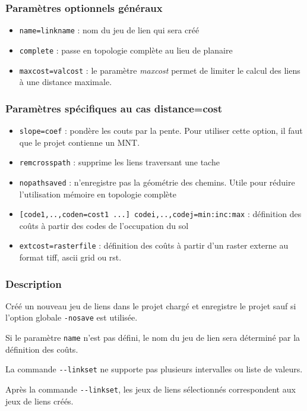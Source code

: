 \documentclass[a4paper,10pt]{report}
\begin{document}
\subsubsection{Paramètres optionnels généraux}
\begin{itemize}
	\item \verb|name=linkname| : nom du jeu de lien qui sera créé
	\item \verb|complete| : passe en topologie complète au lieu de planaire 
	\item \verb|maxcost=valcost| : le paramètre \textit{maxcost} permet de limiter le calcul des liens à une distance maximale.
\end{itemize}

\subsubsection{Paramètres spécifiques au cas distance=cost}
\begin{itemize}
	\item \verb|slope=coef| : pondère les couts par la pente. Pour utiliser cette option, il faut que le projet contienne un MNT.
	\item \verb|remcrosspath| : supprime les liens traversant une tache
	\item \verb|nopathsaved| : n'enregistre pas la géométrie des chemins. Utile pour réduire l'utilisation mémoire en topologie complète
	\item \verb|[code1,..,coden=cost1 ...] codei,..,codej=min:inc:max| : définition des coûts à partir des codes de l'occupation du sol
	\item \verb|extcost=rasterfile| : définition des coûts à partir d'un raster externe au format tiff, ascii grid ou rst.
\end{itemize}

\subsubsection{Description}
Créé un nouveau jeu de liens dans le projet chargé et enregistre le projet sauf si l'option globale \verb|-nosave| est utilisée.

Si le paramètre \verb|name| n'est pas défini, le nom du jeu de lien sera déterminé par la définition des coûts.

La commande \verb|--linkset| ne supporte pas plusieurs intervalles ou liste de valeurs.

Après la commande \verb|--linkset|, les jeux de liens sélectionnés correspondent aux jeux de liens créés.
\end{document}
